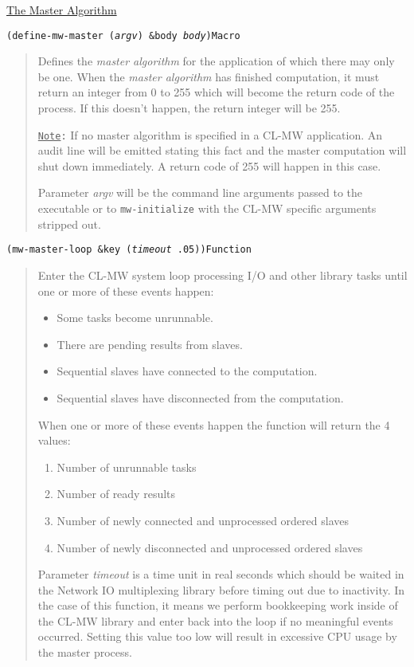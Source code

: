 \documentclass[titlepage,12pt]{book}
\newcommand{\xsmall}{\latexhtml{\small}{}}
\newcommand{\xnormalsize}{\latexhtml{\normalsize}{}}
\newcommand{\clmw}{\xsmall\textsc{CL-MW}\xnormalsize\xspace}
\newcommand{\ma}{\textit{master algorithm}\xspace}
\newcommand{\func}[1]{\mbox{\texttt{#1}}\xspace}
\newcommand{\Note}{\texttt{\underline{Note}:}\xspace}
\newcommand{\apiheader}[1]{\begin{center}\underline{#1}\end{center}}
\newcommand{\apifunc}[2]{\noindent\xsmall\texttt{(#1)}\hspace*{\fill}\xnormalsize\texttt{#2}}
\newenvironment{apientry}[2]
	{\apifunc{#1}{#2}\begin{quotation}}
	{\end{quotation}}
\newcommand{\phlabel}[1]{\phantomsection\label{#1}}
\begin{document}
\apiheader{\phlabel{master-algorithm-api}The Master Algorithm}
\begin{apientry}
{define-mw-master (\emph{argv}) \&body \emph{body}}
{Macro}
Defines the \ma for the application of which there may only be one.
When the \ma has finished computation, it must return an integer from 0 to 255
which will become the return code of the process. If this doesn't happen,
the return integer will be 255.

\Note If no master algorithm is specified in a \clmw application. An
audit line will be emitted stating this fact and the master computation
will shut down immediately. A return code of 255 will happen in
this case.

Parameter \emph{argv} will be the command line arguments passed to
the executable or to \func{mw-initialize} with the \clmw specific
arguments stripped out.
\end{apientry}

\begin{apientry}
{mw-master-loop \&key (\emph{timeout} .05)}
{Function}
Enter the \clmw system loop processing I/O and other library tasks until
one or more of these events happen:
\begin{itemize}
\item Some tasks become unrunnable.
\item There are pending results from slaves.
\item Sequential slaves have connected to the computation.
\item Sequential slaves have disconnected from the computation.
\end{itemize}

When one or more of these events happen the function will return the
4 values: 

\begin{enumerate}
\item Number of unrunnable tasks
\item Number of ready results
\item Number of newly connected and unprocessed ordered slaves
\item Number of newly disconnected and unprocessed ordered slaves
\end{enumerate}

Parameter \emph{timeout} is a time unit in real seconds which should
be waited in the Network IO multiplexing library before timing out
due to inactivity.  In the case of this function, it means we perform
bookkeeping work inside of the \clmw library and enter back into the
loop if no meaningful events occurred. Setting this value too low will
result in excessive CPU usage by the master process.

\end{apientry}
\end{document}
